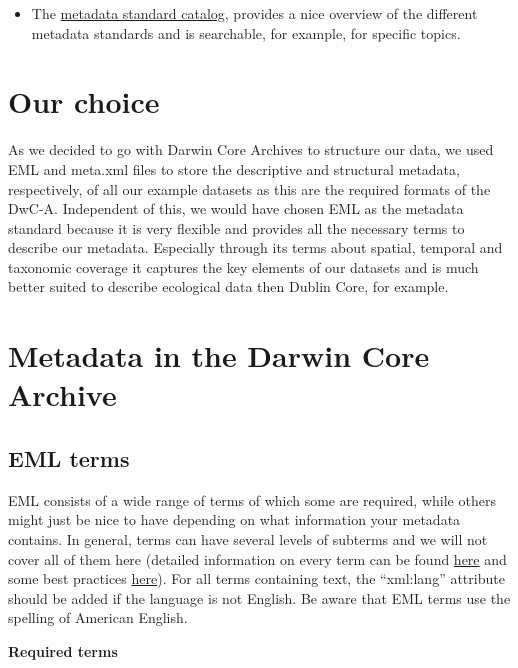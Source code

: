 \documentclass[
]{book}
\providecommand{\tightlist}{%
  \setlength{\itemsep}{0pt}\setlength{\parskip}{0pt}}
\begin{document}
\begin{itemize}
\tightlist
\item
  The \href{https://rdamsc.bath.ac.uk/}{metadata standard catalog}, provides a nice overview of the different metadata standards and is searchable, for example, for specific topics.
\end{itemize}

\hypertarget{our-choice-2}{%
\section{Our choice}\label{our-choice-2}}

As we decided to go with Darwin Core Archives to structure our data, we used EML and meta.xml files to store the descriptive and structural metadata, respectively, of all our example datasets as this are the required formats of the DwC-A. Independent of this, we would have chosen EML as the metadata standard because it is very flexible and provides all the necessary terms to describe our metadata. Especially through its terms about spatial, temporal and taxonomic coverage it captures the key elements of our datasets and is much better suited to describe ecological data then Dublin Core, for example.

\hypertarget{metadata-DwCA}{%
\section{Metadata in the Darwin Core Archive}\label{metadata-DwCA}}

\hypertarget{eml-terms}{%
\subsection{EML terms}\label{eml-terms}}

EML consists of a wide range of terms of which some are required, while others might just be nice to have depending on what information your metadata contains. In general, terms can have several levels of subterms and we will not cover all of them here (detailed information on every term can be found \href{https://eml.ecoinformatics.org/schema/}{here} and some best practices \href{https://ediorg.github.io/data-package-best-practices/eml-best-practices.html}{here}). For all terms containing text, the ``xml:lang'' attribute should be added if the language is not English. Be aware that EML terms use the spelling of American English.

{\textbf{Required terms}}
\end{document}
